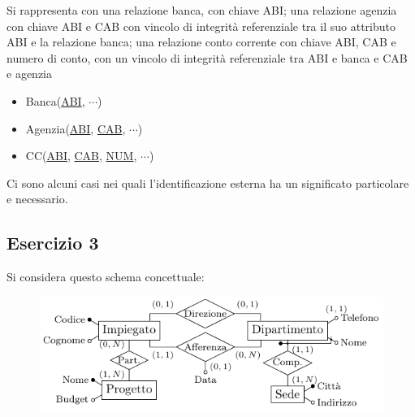\documentclass{article}
\numberwithin{equation}{subsection}
\begin{document}
Si rappresenta con una relazione banca, con chiave ABI; una relazione agenzia con chiave ABI e CAB con vincolo di integrità referenziale tra 
il suo attributo ABI e la relazione banca; una relazione conto corrente con chiave ABI, CAB e numero di conto, con un vincolo di integrità 
referenziale tra ABI e banca e CAB e agenzia
\begin{itemize}
    \item Banca(\underline{ABI}, $\cdots$)
    \item Agenzia(\underline{ABI}, \underline{CAB}, $\cdots$)
    \item CC(\underline{ABI}, \underline{CAB}, \underline{NUM}, $\cdots$)
\end{itemize}

Ci sono alcuni casi nei quali l'identificazione esterna ha un significato particolare e necessario. 

\subsection{Esercizio 3}

Si considera questo schema concettuale:

\begin{figure}[H]%
    \centering%
    \includegraphics[scale=1.25]{schema_azienda_25-11-24.pdf}%
\end{figure}
\end{document}
